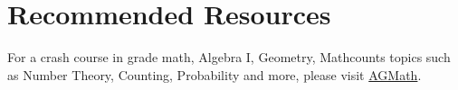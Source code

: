\chapter{Recommended Resources}

For a crash course in  grade math, Algebra I, Geometry, Mathcounts topics such as Number Theory, Counting, Probability and more, please visit \href{http://agmath.com}{AGMath}\cite{agmath}.